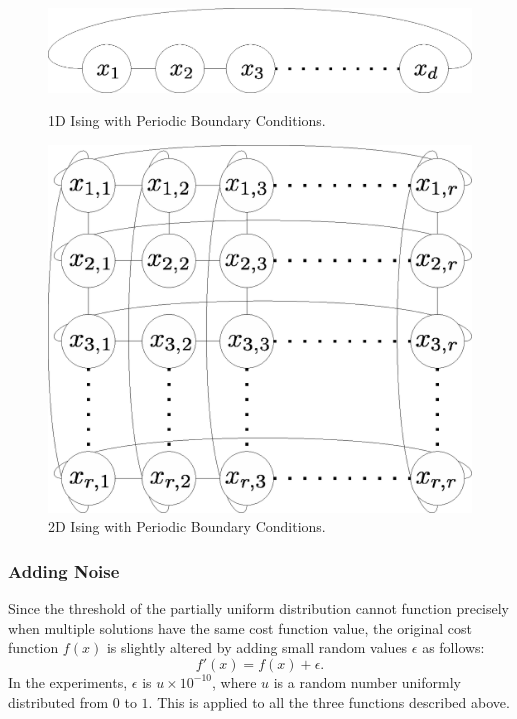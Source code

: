 \begin{figure}[tbp]
\centerline{\includegraphics[width=\hfiglength\linewidth]{data_etc/1d_ising.eps}}
\caption{1D Ising with Periodic Boundary Conditions.}
\label{fig-1d}
\vspace{0.2in}
\centerline{\includegraphics[width=\hfiglength\linewidth]{data_etc/2d_ising.eps}}
\caption{2D Ising with Periodic Boundary Conditions.}
\label{fig-2d}
\end{figure}


\subsubsection{Adding Noise}
Since the threshold of the partially uniform distribution
cannot function precisely
when multiple solutions have the same cost function value,
the original cost function $f(x)$ is slightly altered
by adding small random values $\epsilon$ as follows:
\begin{equation}
 f'(x)=f(x)+\epsilon
.
\end{equation}
In the experiments,
$\epsilon$ is $u \times 10^{-10}$, where $u$ is a random number
uniformly distributed from $0$ to $1$.
This is applied to all the three functions described above.



